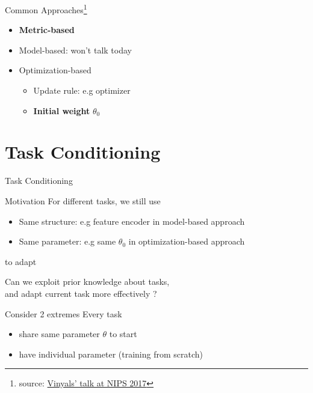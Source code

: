 \documentclass{beamer}
\begin{document}
\begin{frame}{Common Approaches\footnote{source: \href{http://metalearning-symposium.ml/files/vinyals.pdf}{Vinyals' talk at NIPS 2017}}}
  \begin{itemize}
    \item \textbf{Metric-based}
    \item Model-based: won't talk today
    \item Optimization-based
      \begin{itemize}
        \item Update rule: e.g optimizer
      \item \textbf{Initial weight} $\theta_0$
      \end{itemize}
  \end{itemize}
\end{frame}

\section{Task Conditioning}
\begin{frame}
  \begin{center}
    \LARGE{Task Conditioning}
  \end{center}
\end{frame}

\begin{frame}{Motivation}
  For different tasks, we still use
  \begin{itemize}
    \item Same structure: e.g feature encoder in model-based approach
    \item Same parameter: e.g same $\theta_0$ in optimization-based approach
  \end{itemize}
  to adapt

  \begin{center}
    Can we exploit prior knowledge about tasks,\\ and adapt current task more effectively ?
  \end{center}
\end{frame}

\begin{frame}{Consider 2 extremes}
  Every task
  \begin{itemize}
    \item share same parameter $\theta$ to start
    \item have individual parameter (training from scratch)
  \end{itemize}
\end{frame}
\end{document}
